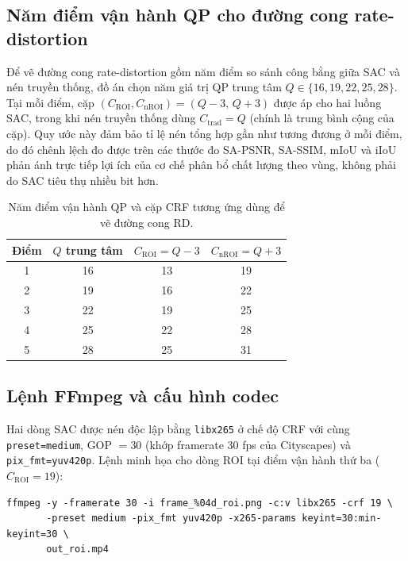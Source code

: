 \subsection{Năm điểm vận hành QP cho đường cong rate-distortion}

Để vẽ đường cong rate-distortion gồm năm điểm so sánh công bằng giữa SAC và nén truyền thống, đồ án chọn năm giá trị QP trung tâm $Q \in \{16, 19, 22, 25, 28\}$. Tại mỗi điểm, cặp $(C_\mathrm{ROI}, C_\mathrm{nROI}) = (Q-3,\,Q+3)$ được áp cho hai luồng SAC, trong khi nén truyền thống dùng $C_\mathrm{trad} = Q$ (chính là trung bình cộng của cặp). Quy ước này đảm bảo tỉ lệ nén tổng hợp gần như tương đương ở mỗi điểm, do đó chênh lệch đo được trên các thước đo SA-PSNR, SA-SSIM, mIoU và iIoU phản ánh trực tiếp lợi ích của cơ chế phân bổ chất lượng theo vùng, không phải do SAC tiêu thụ nhiều bit hơn.

\begin{table}[H]
\centering
\caption{Năm điểm vận hành QP và cặp CRF tương ứng dùng để vẽ đường cong RD.}
\label{tab:qp-points}
\small
\begin{tabular}{c|c|c|c}
\hline
\textbf{Điểm} & \textbf{$Q$ trung tâm} & \textbf{$C_\mathrm{ROI} = Q-3$} & \textbf{$C_\mathrm{nROI} = Q+3$} \\
\hline
1 & 16 & 13 & 19 \\
2 & 19 & 16 & 22 \\
3 & 22 & 19 & 25 \\
4 & 25 & 22 & 28 \\
5 & 28 & 25 & 31 \\
\hline
\end{tabular}
\end{table}

\subsection{Lệnh FFmpeg và cấu hình codec}

Hai dòng SAC được nén độc lập bằng \texttt{libx265} ở chế độ CRF với cùng \texttt{preset=medium}, GOP $=30$ (khớp framerate 30 fps của Cityscapes) và \texttt{pix\_fmt=yuv420p}. Lệnh minh họa cho dòng ROI tại điểm vận hành thứ ba ($C_\mathrm{ROI} = 19$):

\begin{verbatim}
ffmpeg -y -framerate 30 -i frame_%04d_roi.png -c:v libx265 -crf 19 \
       -preset medium -pix_fmt yuv420p -x265-params keyint=30:min-keyint=30 \
       out_roi.mp4
\end{verbatim}

